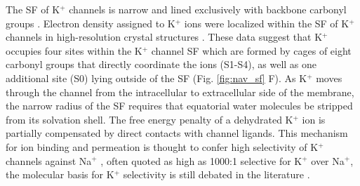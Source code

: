 \begin{refsection}
The SF of K$^+$ channels is narrow and lined exclusively with backbone carbonyl groups \cite{Doyle:1998wq,Long:2005do,Long:2007cv}. Electron density assigned to K$^+$ ions were localized within the SF of K$^+$ channels in high-resolution crystal structures \cite{Zhou:2001vo}. These data suggest that K$^+$ occupies four sites within the K$^+$ channel SF which are formed by cages of eight carbonyl groups that directly coordinate the ions (S1-S4), as well as one additional site (S0) lying outside of the SF (Fig. \ref{fig:nav_sf} F). As K$^+$ moves through the channel from the intracellular to extracellular side of the membrane, the narrow radius of the SF requires that equatorial water molecules be stripped from its solvation shell. The free energy penalty of a dehydrated K$^+$ ion is partially compensated by direct contacts with channel ligands. This mechanism for ion binding and permeation is thought to confer high selectivity of K$^+$ channels against Na$^+$ \cite{Nimigean:2011ww}, often quoted as high as 1000:1 selective for K$^+$ over Na$^+$, the molecular basis for K$^+$ selectivity is still debated in the literature \cite{Andersen:2011ty}.


\end{refsection}
